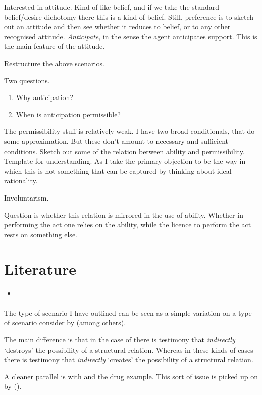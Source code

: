 \documentclass[10pt]{article}
\begin{document}
{
  \color{red}
  Interested in attitude.
  Kind of like belief, and if we take the standard belief/desire dichotomy there this is a kind of belief.
  Still, preference is to sketch out an attitude and then see whether it reduces to belief, or to any other recognised attitude.
  \emph{Anticipate}, in the sense the agent anticipates support.
  This is the main feature of the attitude.

  Restructure the above scenarios.
}

Two questions.
\begin{enumerate}
\item Why anticipation?
\item When is anticipation permissible?
\end{enumerate}

{
  \color{red}
  The permissibility stuff is relatively weak.
  I have two broad conditionals, that do some approximation.
  But these don't amount to necessary and sufficient conditions.
  Sketch out some of the relation between ability and permissibility.
  Template for understanding.
  As I take the primary objection to be the way in which this is not something that can be captured by thinking about ideal rationality.

  Involuntarism.
}

Question is whether this relation is mirrored in the use of ability.
Whether in performing the act one relies on the ability, while the licence to perform the act rests on something else.


\section{Literature}
\label{sec:literature}

\begin{itemize}
\item \textcite{Worsnip:2018aa}
\end{itemize}

The type of scenario I have outlined can be seen as a simple variation on a type of scenario consider by \textcite{Worsnip:2018aa} (among others).

The main difference is that in the case of \citeauthor{Worsnip:2018aa} there is testimony that \emph{indirectly} `destroys' the possibility of a structural relation.
Whereas in these kinds of cases there is testimony that \emph{indirectly} `creates' the possibility of a structural relation.

A cleaner parallel is with \cite{Christensen:2007aa} and the drug example.
This sort of issue is picked up on by \citeauthor{Neta:2019aa} (\citeyear[189]{Neta:2019aa}).
\end{document}
